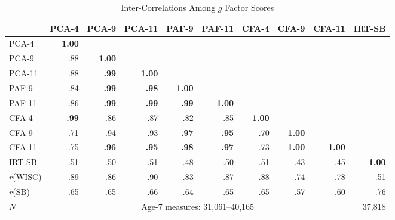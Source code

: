 \documentclass[12pt]{article}
\begin{document}
\begin{table}[H]
\centering
\caption{Inter-Correlations Among $g$ Factor Scores}
\label{tab:g_cormat}
\small
\begin{tabular}{lrrrrrrrrr}
\toprule
 & PCA-4 & PCA-9 & PCA-11 & PAF-9 & PAF-11 & CFA-4 & CFA-9 & CFA-11 & IRT-SB \\
\midrule
PCA-4 & \cellcolor{green!40} \textbf{1.00} & & & & & & & & \\
PCA-9 & \cellcolor{green!30} .88 & \cellcolor{green!40} \textbf{1.00} & & & & & & & \\
PCA-11 & \cellcolor{green!30} .88 & \cellcolor{green!40} \textbf{.99} & \cellcolor{green!40} \textbf{1.00} & & & & & & \\
PAF-9 & \cellcolor{green!20} .84 & \cellcolor{green!40} \textbf{.99} & \cellcolor{green!40} \textbf{.98} & \cellcolor{green!40} \textbf{1.00} & & & & & \\
PAF-11 & \cellcolor{green!30} .86 & \cellcolor{green!40} \textbf{.99} & \cellcolor{green!40} \textbf{.99} & \cellcolor{green!40} \textbf{.99} & \cellcolor{green!40} \textbf{1.00} & & & & \\
CFA-4 & \cellcolor{green!40} \textbf{.99} & \cellcolor{green!30} .86 & \cellcolor{green!30} .87 & \cellcolor{green!20} .82 & \cellcolor{green!20} .85 & \cellcolor{green!40} \textbf{1.00} & & & \\
CFA-9 & \cellcolor{green!20} .71 & \cellcolor{green!30} .94 & \cellcolor{green!30} .93 & \cellcolor{green!40} \textbf{.97} & \cellcolor{green!40} \textbf{.95} & \cellcolor{yellow!30} .70 & \cellcolor{green!40} \textbf{1.00} & & \\
CFA-11 & \cellcolor{green!20} .75 & \cellcolor{green!40} \textbf{.96} & \cellcolor{green!40} \textbf{.95} & \cellcolor{green!40} \textbf{.98} & \cellcolor{green!40} \textbf{.97} & \cellcolor{green!20} .73 & \cellcolor{green!40} \textbf{1.00} & \cellcolor{green!40} \textbf{1.00} & \\
IRT-SB & \cellcolor{yellow!30} .51 & \cellcolor{yellow!30} .50 & \cellcolor{yellow!30} .51 & \cellcolor{yellow!15} .48 & \cellcolor{yellow!30} .50 & \cellcolor{yellow!30} .51 & \cellcolor{yellow!15} .43 & \cellcolor{yellow!15} .45 & \cellcolor{green!40} \textbf{1.00} \\
\midrule
$r$(WISC) & .89 & .86 & .90 & .83 & .87 & .88 & .74 & .78 & .51 \\
$r$(SB) & .65 & .65 & .66 & .64 & .65 & .65 & .57 & .60 & .76 \\
$N$ & \multicolumn{8}{c}{Age-7 measures: 31,061--40,165} & 37,818 \\

\end{tabular}
\end{table}
\end{document}

